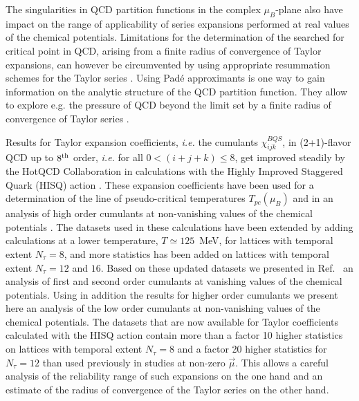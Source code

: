 \documentclass[pdflatex,prd,twocolumn,showpacs,superscriptaddress,nofootinbib]{revtex4-1}
\begin{document}
The singularities in QCD
partition functions in the complex $\mu_B$-plane also
have impact on the range of applicability of series
expansions performed at real values of the chemical 
potentials.
Limitations for the determination of the searched for critical point in QCD, arising from a finite 
radius of convergence of Taylor expansions, can however be circumvented by using appropriate resummation schemes for the Taylor series \cite{Gavai:2008zr,Skokov:2010uc,Datta:2016ukp,Vovchenko:2017gkg,Mondal:2021jxk,Borsanyi:2021sxv,Borsanyi:2022qlh}. Using Pad\'e
approximants is one way to gain information on the analytic structure of the QCD partition function. They allow to explore e.g. the 
pressure of QCD beyond the limit set by a finite radius of convergence of Taylor series \cite{Karsch:2010hm,Dimopoulos:2021vrk,Schmidt:2021pey,Datta:2016ukp, Basar:2021gyi}.

Results for Taylor expansion coefficients, {\it i.e.} the cumulants $\chi_{ijk}^{BQS}$, in (2+1)-flavor QCD 
up to $8^{\rm th}$ order, {\it i.e.} for all $0 <(i+j+k) \le 8$, get 
improved steadily by the HotQCD Collaboration \cite{HotQCD:2018pds,Bazavov:2020bjn,Bollweg:2021vqf} in calculations with the 
Highly Improved Staggered Quark (HISQ) action \cite{Follana:2006rc}.
These expansion coefficients have been used
for a determination of the line of pseudo-critical
temperatures $T_{pc}(\mu_B)$ \cite{HotQCD:2018pds}
and in an analysis of high order cumulants at 
non-vanishing values of the chemical potentials 
\cite{Bazavov:2020bjn}. The datasets used in these
calculations have been extended 
by adding calculations at a lower temperature, 
$T\simeq 125$~MeV,  for lattices with temporal extent $N_\tau=8$, and more statistics has been added 
on lattices with temporal extent $N_\tau=12$ and $16$.
Based on these updated
datasets we presented in Ref.~\cite{Bollweg:2021vqf} an analysis of
first and second order cumulants at vanishing values of the chemical
potentials. Using in addition the results for higher order cumulants we present
here an analysis of the low order cumulants at non-vanishing
values of the chemical potentials. 
The datasets that are now available for Taylor coefficients
calculated with the HISQ action 
contain more than a factor 10 higher statistics on lattices with 
temporal extent $N_\tau=8$ and a factor 20 higher statistics for 
$N_\tau=12$  than used previously in studies at non-zero $\vec{\mu}$.  This allows a careful analysis of
the reliability range of such expansions on the one hand and an estimate of the radius of convergence of the
Taylor series on the other hand.
\end{document}
